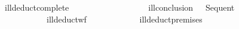 \ ill{\isacharunderscore}deduct{\isacharunderscore}complete{\isacharcolon}\isanewline
\ \ \ \ {\isasymturnstile}\ \isanewline
\ \ \ \ \ \isanewline
\ \ \ \ \ \ \ ill{\isacharunderscore}conclusion\ \ {\isacharequal}\ Sequent\ \ \isanewline
\ \ \ \ \ \ \ \ \ \ \ ill{\isacharunderscore}deduct{\isacharunderscore}wf\ \isanewline
\ \ \ \ \ \ \ \ \ \ \ ill{\isacharunderscore}deduct{\isacharunderscore}premises\ \ \isacharequal\ \isalist{}
